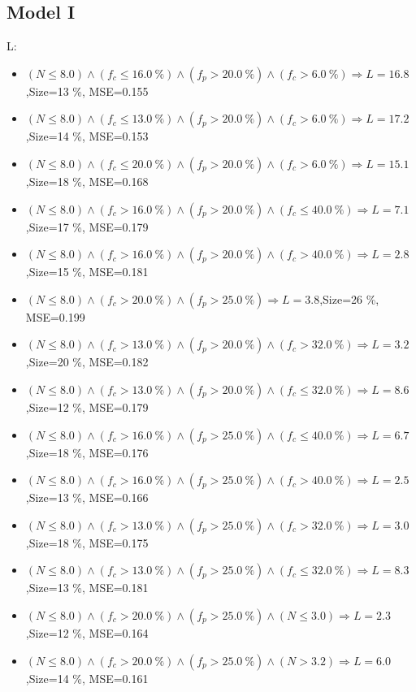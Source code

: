\documentclass[numbered]{CSL}
\begin{document}
\subsection{Model I}
L:
\begin{itemize}
\item $(N \leq 8.0) \land (f_c \leq 16.0~\%) \land (f_p > 20.0~\%) \land (f_c > 6.0~\%) \Rightarrow L = 16.8$,\hfill Size=13 \%, MSE=0.155
\item $(N \leq 8.0) \land (f_c \leq 13.0~\%) \land (f_p > 20.0~\%) \land (f_c > 6.0~\%) \Rightarrow L = 17.2$,\hfill Size=14 \%, MSE=0.153
\item $(N \leq 8.0) \land (f_c \leq 20.0~\%) \land (f_p > 20.0~\%) \land (f_c > 6.0~\%) \Rightarrow L = 15.1$,\hfill Size=18 \%, MSE=0.168
\item $(N \leq 8.0) \land (f_c > 16.0~\%) \land (f_p > 20.0~\%) \land (f_c \leq 40.0~\%) \Rightarrow L = 7.1$,\hfill Size=17 \%, MSE=0.179
\item $(N \leq 8.0) \land (f_c > 16.0~\%) \land (f_p > 20.0~\%) \land (f_c > 40.0~\%) \Rightarrow L = 2.8$,\hfill Size=15 \%, MSE=0.181
\item $(N \leq 8.0) \land (f_c > 20.0~\%) \land (f_p > 25.0~\%) \Rightarrow L = 3.8$,\hfill Size=26 \%, MSE=0.199
\item $(N \leq 8.0) \land (f_c > 13.0~\%) \land (f_p > 20.0~\%) \land (f_c > 32.0~\%) \Rightarrow L = 3.2$,\hfill Size=20 \%, MSE=0.182
\item $(N \leq 8.0) \land (f_c > 13.0~\%) \land (f_p > 20.0~\%) \land (f_c \leq 32.0~\%) \Rightarrow L = 8.6$,\hfill Size=12 \%, MSE=0.179
\item $(N \leq 8.0) \land (f_c > 16.0~\%) \land (f_p > 25.0~\%) \land (f_c \leq 40.0~\%) \Rightarrow L = 6.7$,\hfill Size=18 \%, MSE=0.176
\item $(N \leq 8.0) \land (f_c > 16.0~\%) \land (f_p > 25.0~\%) \land (f_c > 40.0~\%) \Rightarrow L = 2.5$,\hfill Size=13 \%, MSE=0.166
\item $(N \leq 8.0) \land (f_c > 13.0~\%) \land (f_p > 25.0~\%) \land (f_c > 32.0~\%) \Rightarrow L = 3.0$,\hfill Size=18 \%, MSE=0.175
\item $(N \leq 8.0) \land (f_c > 13.0~\%) \land (f_p > 25.0~\%) \land (f_c \leq 32.0~\%) \Rightarrow L = 8.3$,\hfill Size=13 \%, MSE=0.181
\item $(N \leq 8.0) \land (f_c > 20.0~\%) \land (f_p > 25.0~\%) \land (N \leq 3.0) \Rightarrow L = 2.3$,\hfill Size=12 \%, MSE=0.164
\item $(N \leq 8.0) \land (f_c > 20.0~\%) \land (f_p > 25.0~\%) \land (N > 3.2) \Rightarrow L = 6.0$,\hfill Size=14 \%, MSE=0.161

\end{itemize}
\end{document}
